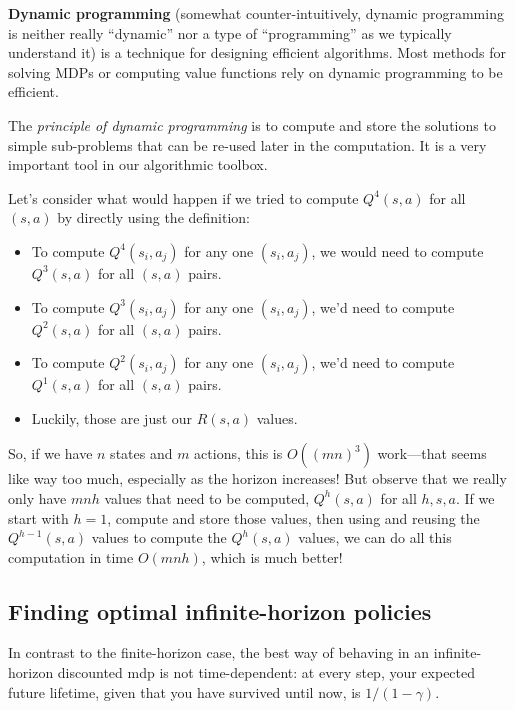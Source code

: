 \begin{examplebox} {\bf Dynamic programming}
  (somewhat
counter-intuitively, dynamic programming is neither really ``dynamic''
nor a type of ``programming'' as we typically understand it) is
a technique for designing efficient algorithms.  Most methods for
solving MDPs or computing value functions rely on dynamic
programming to be efficient.

  The {\em principle of dynamic programming} is to compute and store the
solutions to simple sub-problems that can be re-used later in the
computation.  It is a very important tool in our algorithmic toolbox.

  Let's consider what would happen if we tried to compute $Q^4(s,
  a)$ for all $(s, a)$ by directly using the definition:
  \begin{itemize}
  \item To compute $Q^4(s_i, a_j)$ for any one $(s_i, a_j)$, we would
    need to compute $Q^3(s, a)$ for all $(s, a)$ 
    pairs.
  \item To compute $Q^3(s_i, a_j)$ for any one $(s_i, a_j)$, we'd need to
    compute $Q^2(s, a)$ for all $(s, a)$ pairs.
  \item To compute $Q^2(s_i, a_j)$ for any one $(s_i, a_j)$, we'd
    need to compute $Q^1(s, a)$ for all $(s, a)$ pairs.
  \item Luckily, those are just our $R(s, a)$ values.
  \end{itemize}

So, if we have $n$ states and $m$ actions, this is $O((mn)^3)$
work---that seems like way too much, especially as the horizon
increases!  But observe that we really only have $mnh$ values that
need to be computed, $Q^h(s, a)$ for all $h, s, a$.  If we start with
$h=1$, compute and store those values, then using and reusing the
$Q^{h-1}(s, a)$ values to compute the $Q^h(s, a)$ values, we can do
all this computation in time $O(mnh)$, which is much better!

\end{examplebox}

\subsection{Finding optimal infinite-horizon policies}
\label{sec:mdp_infinite_horizon_optimal}

In contrast to the finite-horizon case, the best way of behaving in an
infinite-horizon discounted {\sc mdp} is not time-dependent: at every
step, your expected future lifetime, given that you have survived
until now, is $1 / (1 - \gamma)$.
%

